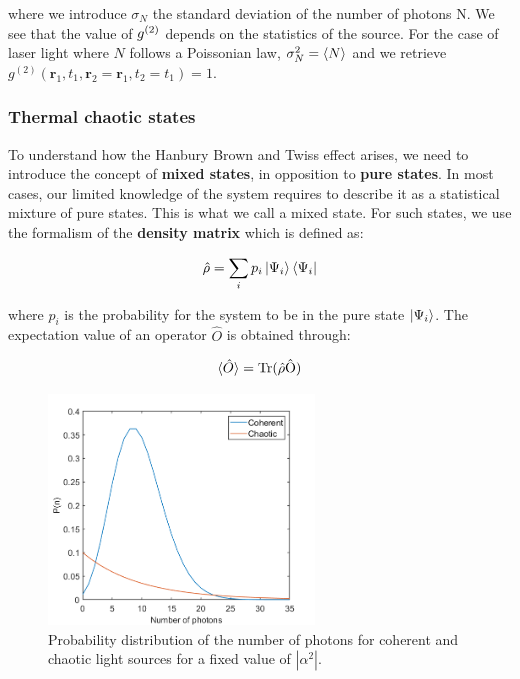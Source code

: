 \noindent where we introduce $\sigma_N$ the standard deviation of the number of photons N. We see that the value of $g^{(2)}$ depends on the statistics of the source. For the case of laser light where $N$ follows a Poissonian law, $\sigma_N^2 = \langle N\rangle$ and we retrieve $g^{(2)}\left(\bm{r}_{1}, t_{1}, \bm{r}_{2}=\bm{r}_1, t_{2}=t_1\right) = 1$.

\subsubsection{Thermal chaotic states}

To understand how the Hanbury Brown and Twiss effect arises, we need to introduce the concept of \textbf{mixed states}, in opposition to \textbf{pure states}. In most cases, our limited knowledge of the system requires to describe it as a statistical mixture of pure states. This is what we call a mixed state. For such states, we use the formalism of the \textbf{density matrix} which is defined as:

\begin{equation}
    \hat{\rho} = \sum_{i} p_i \ket{\Psi_i} \bra{\Psi_i}
\end{equation}

\noindent where $p_i$ is the probability for the system to be in the pure state $\ket{\Psi_i}$. The expectation value of an operator $\hat{O}$ is obtained through:

\begin{equation}
    \langle\hat{O}\rangle = \rm{Tr}(\hat{\rho} \hat{O})
\end{equation}

\begin{figure}
    \centering
    \includegraphics[width=0.63\textwidth]{Fig/Chapter1/coherent_vs_chaotic.png}
    \caption[Probability distribution of photon numbers for coherent and chaotic light sources]{Probability distribution of the number of photons for coherent and chaotic light sources for a fixed value of $|\alpha^2|$.}
    \label{fig:light_statistics}
\end{figure}

